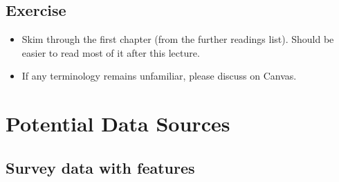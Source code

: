 \documentclass[
]{book}
\providecommand{\tightlist}{%
  \setlength{\itemsep}{0pt}\setlength{\parskip}{0pt}}
\begin{document}
\hypertarget{exercise}{%
\section{Exercise}\label{exercise}}

\begin{itemize}
\tightlist
\item
  Skim through the first chapter (from the further readings list). Should be easier to read most of it after this lecture.
\item
  If any terminology remains unfamiliar, please discuss on Canvas.
\end{itemize}

\hypertarget{potential-data-sources}{%
\chapter{Potential Data Sources}\label{potential-data-sources}}

\hypertarget{survey-data-with-features}{%
\section{Survey data with features}\label{survey-data-with-features}}
\end{document}
